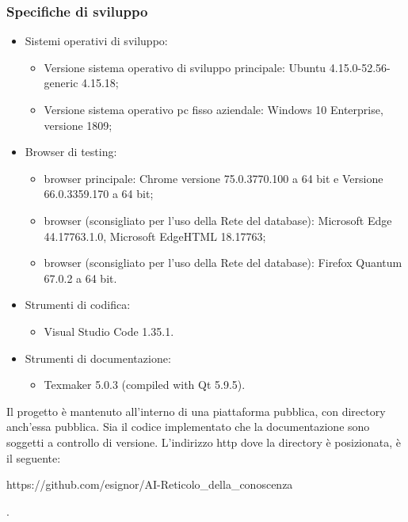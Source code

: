 \subsubsection{Specifiche di sviluppo}
\label{Specifiche di sviluppo}
\begin{itemize}
\item Sistemi operativi di sviluppo:
\begin{itemize}
\item Versione sistema operativo di sviluppo principale: Ubuntu 4.15.0-52.56-generic 4.15.18;
\item Versione sistema operativo pc fisso aziendale: Windows 10 Enterprise, versione 1809;
\end{itemize}
\item Browser di testing:
\begin{itemize}
\item browser principale: Chrome versione 75.0.3770.100 a 64 bit e Versione 66.0.3359.170 a 64 bit;
\item browser (sconsigliato per l'uso della Rete del database): Microsoft Edge 44.17763.1.0, Microsoft EdgeHTML 18.17763;
\item browser (sconsigliato per l'uso della Rete del database): Firefox Quantum 67.0.2 a 64 bit.
\end{itemize}
\item Strumenti di codifica:
\begin{itemize}
\item Visual Studio Code 1.35.1.
\end{itemize}
\item Strumenti di documentazione:
\begin{itemize}
\item Texmaker 5.0.3 (compiled with Qt 5.9.5).
\end{itemize}
\end{itemize}

Il progetto \`e mantenuto all'interno di una piattaforma pubblica, con directory anch'essa pubblica. Sia il codice implementato che la documentazione sono soggetti a controllo di versione.  L'indirizzo http dove la directory \` e posizionata, \`e il seguente:
\begin{center}https://github.com/esignor/AI-Reticolo_della_conoscenza\end{center}.